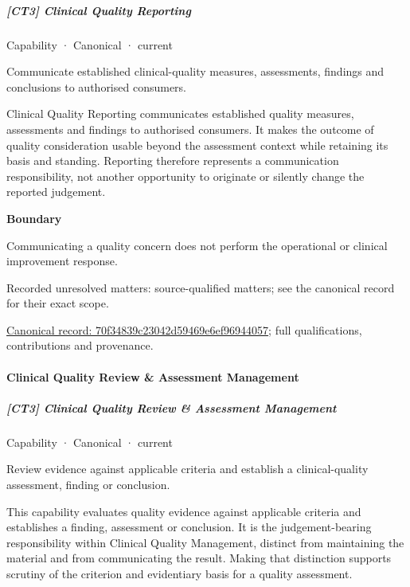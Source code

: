 \subparagraph{[CT3] Clinical Quality Reporting}

\label{element:70f34839c23042d59469e6ef96944057}
{\small Capability · Canonical · current}\par

Communicate established clinical-quality measures, assessments, findings and conclusions to authorised consumers.



Clinical Quality Reporting communicates established quality measures, assessments and findings to authorised consumers. It makes the outcome of quality consideration usable beyond the assessment context while retaining its basis and standing. Reporting therefore represents a communication responsibility, not another opportunity to originate or silently change the reported judgement.



\textbf{Boundary}



Communicating a quality concern does not perform the operational or clinical improvement response.


{\small Recorded unresolved matters: source-qualified matters; see the canonical record for their exact scope.}\par
{\footnotesize \href{../../../../continuum/strategy/capability/70f34839c23042d59469e6ef96944057.md}{Canonical record: 70f34839c23042d59469e6ef96944057}; full qualifications, contributions and provenance.}\par
\paragraph{Clinical Quality Review \& Assessment Management}

\subparagraph{[CT3] Clinical Quality Review \& Assessment Management}

\label{element:8318c35b302b4dcaa0e795fbfdc93e3b}
{\small Capability · Canonical · current}\par

Review evidence against applicable criteria and establish a clinical-quality assessment, finding or conclusion.



This capability evaluates quality evidence against applicable criteria and establishes a finding, assessment or conclusion. It is the judgement-bearing responsibility within Clinical Quality Management, distinct from maintaining the material and from communicating the result. Making that distinction supports scrutiny of the criterion and evidentiary basis for a quality assessment.



